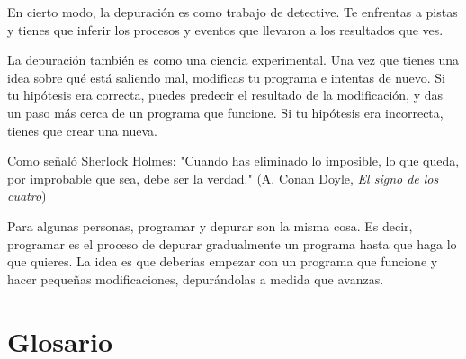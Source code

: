 \documentclass[12pt,letterpaper]{book}
\begin{document}
En cierto modo, la depuración es como trabajo de detective. Te enfrentas a pistas y tienes que inferir los procesos y eventos que llevaron a los resultados que ves.

La depuración también es como una ciencia experimental. Una vez que tienes una idea sobre qué está saliendo mal, modificas tu programa e intentas de nuevo. Si tu hipótesis era correcta, puedes predecir el resultado de la modificación, y das un paso más cerca de un programa que funcione. Si tu hipótesis era incorrecta, tienes que crear una nueva.

Como señaló Sherlock Holmes: "Cuando has eliminado lo imposible, lo que queda, por improbable que sea, debe ser la verdad." (A. Conan Doyle, \textit{El signo de los cuatro})

Para algunas personas, programar y depurar son la misma cosa. Es decir, programar es el proceso de depurar gradualmente un programa hasta que haga lo que quieres. La idea es que deberías empezar con un programa que funcione y hacer pequeñas modificaciones, depurándolas a medida que avanzas.

\section{Glosario}
\end{document}

